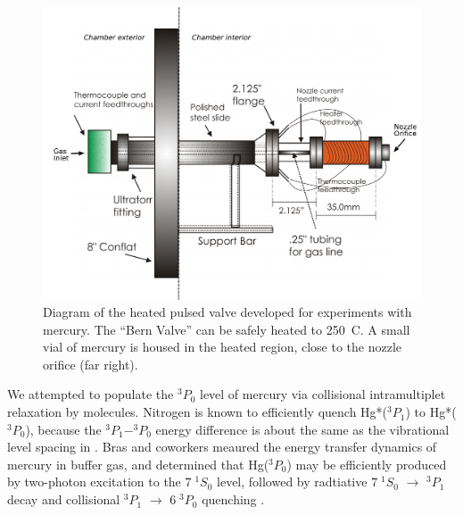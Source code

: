 \begin{figure}
  \caption{Diagram of the heated pulsed valve developed for
    experiments with mercury.  The ``Bern Valve'' can be safely heated
    to 250\degrees\ C.  A small vial of mercury is housed in the
    heated region, close to the nozzle orifice (far right).}
  \label{fig:bern-diagram}
  \centering
  \vspace{1cm}
  \includegraphics[width=6.3in, trim=1cm 0 0 0]{bern-diagram.pdf}
  \vspace{1in}
\end{figure}

We attempted to populate the $^3P_0$ level of mercury via collisional
intramultiplet relaxation by  molecules.  Nitrogen is known to
efficiently quench Hg*($^3P_1$) to Hg*($^3P_0$), because the
$^3P_1-^3P_0$ energy difference is about the same as the vibrational
level spacing in  \cite{callear70, horiguchi71, mitchell61}.
Bras and coworkers meaured the energy transfer dynamics of mercury in
 buffer gas, and determined that Hg($^3P_0$) may be efficiently
produced by two-photon excitation to the $7 \; ^1S_0$ level, followed
by radtiative $7 \; ^1S_0$ $\rightarrow$ $^3P_1$ decay and collisional
$^3P_1$ $\rightarrow$ $6 \; ^3P_0$ quenching \cite{bras93}.

